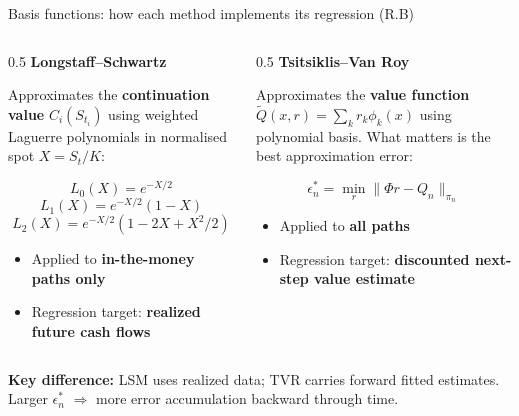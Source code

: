 \documentclass[
  11pt,
  ignorenonframetext,
  aspectratio=169,
]{beamer}
\providecommand{\tightlist}{%
  \setlength{\itemsep}{0pt}\setlength{\parskip}{0pt}}
\begin{document}
\begin{frame}{Basis functions: how each method implements its regression
(R.B)}
\label{basis-functions-how-each-method-implements-its-regression-r.b}
\begin{columns}[T]
\begin{column}{0.5\linewidth}
\textbf{Longstaff--Schwartz}

Approximates the \textbf{continuation value} \(C_i(S_{t_i})\) using
weighted Laguerre polynomials in normalised spot \(X = S_t/K\):

\[L_0(X) = e^{-X/2}\] \[L_1(X) = e^{-X/2}(1-X)\]
\[L_2(X) = e^{-X/2}(1 - 2X + X^2/2)\]

\begin{itemize}
\tightlist
\item
  Applied to \textbf{in-the-money paths only}
\item
  Regression target: \textbf{realized future cash flows}
\end{itemize}
\end{column}

\begin{column}{0.5\linewidth}
\textbf{Tsitsiklis--Van Roy}

Approximates the \textbf{value function}
\(\tilde{Q}(x,r) = \sum_k r_k \phi_k(x)\) using polynomial basis. What
matters is the best approximation error:

\[\epsilon_n^* = \min_r \|\Phi r - Q_n\|_{\pi_n}\]

\begin{itemize}
\tightlist
\item
  Applied to \textbf{all paths}
\item
  Regression target: \textbf{discounted next-step value estimate}
\end{itemize}
\end{column}
\end{columns}

\textbf{Key difference:} LSM uses realized data; TVR carries forward
fitted estimates. Larger \(\epsilon_n^*\) \(\Rightarrow\) more error
accumulation backward through time.
\end{frame}
\end{document}
